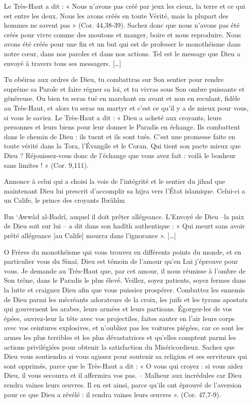 Le Très-Haut a dit : « Nous n'avons pas créé par jeux les cieux, la
terre et ce qui est entre les deux. Nous les avons créés en toute
Vérité, mais la plupart des hommes ne savent pas » (Cor. 44,38-39).
Sachez donc que nous n'avons pas été créés pour vivre comme des moutons
et manger, boire et nous reproduire. Nous avons été créés pour une fin
et un but qui est de professer le monothéisme dans notre cœur, dans nos
paroles et dans nos actions. Tel est le message que Dieu a envoyé à
travers tous ses messagers. {[}\ldots{]}

Tu obéiras aux ordres de Dieu, tu combattras sur Son sentier pour rendre
suprême sa Parole et faire régner sa loi, et tu vivras sous Son ombre
puissante et généreuse. Ou bien tu seras tué en marchant en avant et non
en reculant, fidèle au Très-Haut, et alors tu seras un martyr et c'est
ce qu'il y a de mieux pour vous, si vous le saviez. Le Très-Haut a dit :
« Dieu a acheté aux croyants, leurs personnes et leurs biens pour leur
donner le Paradis en échange. Ils combattent dans le chemin de Dieu :
ils tuent et ils sont tués. C'est une promesse faite en toute vérité
dans la Tora, l'Évangile et le Coran. Qui tient son pacte mieux que Dieu
? Réjouissez-vous donc de l'échange que vous avez fait : voilà le
bonheur sans limites ! » (Cor. 9,111).

Annonce à celui qui a choisi la voie de l'intégrité et le sentier du
jihad que maintenant Dieu lui prescrit d'accomplir sa hijra vers l'État
islamique. Celui-ci a un Calife, le prince des croyants Ibrâhîm

Ibn `Awwâd al-Badrî, auquel il doit prêter allégeance. L'Envoyé de Dieu
--la paix de Dieu soit sur lui -- a dit dans son hadîth authentique : «
Qui meurt sans avoir prêté allégeance {[}au Calife{]} mourra dans
l'ignorance ». {[}\ldots{]}

O Frères du monothéisme qui vous trouvez en différents points du monde,
et en particulier vous du Sinaï, Dieu est témoin de l'amour qu'en Lui
j'éprouve pour vous. Je demande au Très-Haut que, par cet amour, il nous
réunisse à l'ombre de Son trône, dans le Paradis le plus élevé. Veillez,
soyez patients, soyez fermes dans la lutte et craignez Dieu afin que
vous puissiez prospérer. Combattez les ennemis de Dieu parmi les
mécréants adorateurs de la croix, les juifs et les tyrans apostats qui
gouvernent les arabes, leurs armées et leurs partisans. Égorgez-les de
vos épées, ouvrez-leur la tête avec vos projectiles, faites sauter en
l'air leurs corps avec vos ceintures explosives, et n'oubliez pas les
voitures piégées, car ce sont les armes les plus terribles et les plus
dévastatrices et qu'elles comptent parmi les actions privilégiées pour
obtenir la satisfaction du Miséricordieux. Sachez que Dieu vous
soutiendra si vous agissez pour soutenir sa religion et ses serviteurs
qui sont opprimés, parce que le Très-Haut a dit : « O vous qui croyez :
si vous aidez Dieu, il vous secourra et il affermira vos pas. -- Malheur
aux incrédules car Dieu rendra vaines leurs œuvres. Il en est ainsi,
parce qu'ils ont éprouvé de l'aversion pour ce que Dieu a révélé : il
rendra vaines leurs œuvres ». (Cor. 47,7-9).


